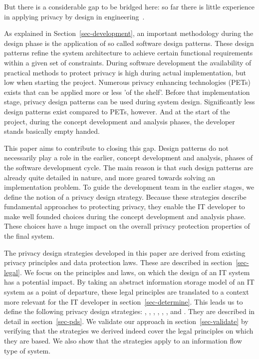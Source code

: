 But there is a considerable gap to be bridged here: so far there is little experience in applying privacy by design in engineering~\cite{gurses2011engineering-privacy}. 

As explained in Section~\ref{sec-development}, an important methodology during the design phase is the application of so called software design patterns. These design patterns refine the system architecture to achieve certain functional requirements within a given set of constraints. 
During software development the availability of practical methods to protect privacy is high during actual implementation, but low when starting the project. Numerous privacy enhancing technologies (PETs) exists that can be applied more or less 'of the shelf'. Before that implementation stage, privacy design patterns can be used during system design. Significantly less design patterns exist compared to PETs, however. And at the start of the project, during the concept development and analysis phases, the developer stands basically empty handed. 

This paper aims to contribute to closing this gap. Design patterns do not necessarily play a role in the earlier, concept development and analysis, phases of the software development cycle. The main reason is that such design patterns are already quite detailed in nature, and more geared towards solving an implementation problem. To guide the development team in the earlier stages, we define the notion of a privacy design strategy. Because these strategies describe fundamental approaches to protecting privacy, they enable the IT developer to make well founded choices during the concept development and analysis phase. These choices have a huge impact on the overall privacy protection properties of the final system.

The privacy design strategies developed in this paper are derived from existing privacy principles and data protection laws. These are described in section~\ref{sec-legal}. We focus on the principles and laws, on which the design of an IT system has a potential impact. By taking an abstract information storage model of an IT system as a point of departure, 
these legal principles are translated to a context more relevant for the IT developer in  section~\ref{sec-determine}. This leads us to define the following privacy design strategies: , , , , , ,   and . They are described in detail in section~\ref{sec-pds}.
We validate our approach in section~\ref{sec-validate} by verifying that the strategies we derived indeed cover the legal principles on which they are based. We also show that the strategies apply to an information flow type of system. 

